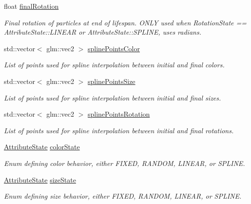 \begin{DoxyCompactItemize}
float \hyperlink{struct_mason_1_1_particle_emitter_config_a37a579321019d25bdb1ecf4f32353d7c}{final\+Rotation}
\begin{DoxyCompactList}\small\item\em Final rotation of particles at end of lifespan. O\+N\+LY used when Rotation\+State == Attribute\+State\+::\+L\+I\+N\+E\+AR or Attribute\+State\+::\+S\+P\+L\+I\+NE, uses radians. \end{DoxyCompactList}\item 
std\+::vector$<$ glm\+::vec2 $>$ \hyperlink{struct_mason_1_1_particle_emitter_config_a66a4652dce73b58e27b8a495e2b6e0eb}{spline\+Points\+Color}
\begin{DoxyCompactList}\small\item\em List of points used for spline interpolation between initial and final colors. \end{DoxyCompactList}\item 
std\+::vector$<$ glm\+::vec2 $>$ \hyperlink{struct_mason_1_1_particle_emitter_config_ae379890e2a2de9c8f4dc1a391393f41a}{spline\+Points\+Size}
\begin{DoxyCompactList}\small\item\em List of points used for spline interpolation between initial and final sizes. \end{DoxyCompactList}\item 
std\+::vector$<$ glm\+::vec2 $>$ \hyperlink{struct_mason_1_1_particle_emitter_config_ae03fbdb37c6738eafedc10564d744e8e}{spline\+Points\+Rotation}
\begin{DoxyCompactList}\small\item\em List of points used for spline interpolation between initial and final rotations. \end{DoxyCompactList}\item 
\hyperlink{namespace_mason_aefc2ce7d9295b57af46ab6c8ebfc32f7}{Attribute\+State} \hyperlink{struct_mason_1_1_particle_emitter_config_a94ad732500966a699dcead307033269a}{color\+State}
\begin{DoxyCompactList}\small\item\em Enum defining color behavior, either F\+I\+X\+ED, R\+A\+N\+D\+OM, L\+I\+N\+E\+AR, or S\+P\+L\+I\+NE. \end{DoxyCompactList}\item 
\hyperlink{namespace_mason_aefc2ce7d9295b57af46ab6c8ebfc32f7}{Attribute\+State} \hyperlink{struct_mason_1_1_particle_emitter_config_a3f6f8e64ff56799d85b8512aa97801eb}{size\+State}
\begin{DoxyCompactList}\small\item\em Enum defining size behavior, either F\+I\+X\+ED, R\+A\+N\+D\+OM, L\+I\+N\+E\+AR, or S\+P\+L\+I\+NE. \end{DoxyCompactList}\item 

\end{DoxyCompactItemize}
